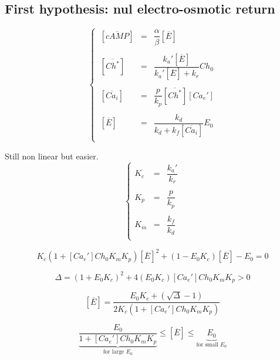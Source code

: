 \documentclass[aps,12pt]{revtex4}
\begin{document}
\subsection{First hypothesis: nul electro-osmotic return}
\begin{equation}
\left\lbrace
\begin{array}{lcl}
~[\overline{cAMP}] & = & \dfrac{\alpha}{\beta}[\overline{E}] \\
\\
~[ \overline{Ch^\ast} ] & = & \dfrac{k_a'[\overline{E}]}{k_a'[\overline{E}]+k_r} Ch_0\\
\\
~[\overline{Ca_i}] & = & \dfrac{p}{k_p}[\overline{Ch^\ast}] [Ca_e']\\
\\
~[\overline{E}] & = & \dfrac{k_d}{k_d+k_f[\overline{Ca_i}]} E_0\\
\end{array}
\right.
\end{equation}

Still non linear but easier.
\begin{equation}
\left\lbrace
\begin{array}{lcl}
K_c & = & \dfrac{k_a'}{k_r} \\
\\
K_p & = & \dfrac{p}{k_p} \\
\\
K_m & = & \dfrac{k_f}{k_d}\\
\end{array}
\right.
\end{equation}

\begin{equation}
K_c(1+[Ca_e'] Ch_0 K_m K_p) [\overline{E}]^2 + (1-E_0K_c) [\overline{E}] - E_0 = 0
\end{equation}

\begin{equation}
	\Delta =	(1+E_0 K_c)^2 + 4 (E_0 K_c) [Ca_e'] Ch_0    K_m  K_p > 0
\end{equation}

\begin{equation}
\boxed{
	[\overline{E}] = \dfrac{E_0 K_c + \left(\sqrt{\Delta} - 1\right)}
	{
	2 K_c(1+[Ca_e'] Ch_0 K_m K_p)
	}
}
\end{equation}

\begin{equation}
	\underbrace{\dfrac{E_0}{1+[Ca_e'] Ch_0 K_m K_p}}_{\text{for large $E_0$}}
		\leq	[\overline{E}] \leq \underbrace{E_0}_{\text{for small $E_0$}}
\end{equation}
\end{document}
